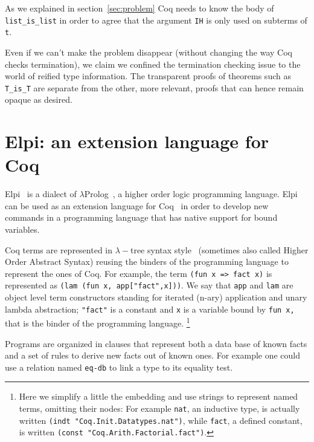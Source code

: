 \documentclass[a4paper,UKenglish,cleveref, autoref]{lipics-v2019}
\begin{document}
\noindent
As we explained in section~\ref{sec:problem} Coq needs to know the
body of  \lstinline+list_is_list+ in order to agree that the argument
\lstinline+IH+ is only used on subterms of \lstinline+t+.

Even if we can't make the problem disappear (without changing the way Coq
checks termination), we claim we confined the termination checking issue
to the world of reified type information. The transparent proofs of
theorems such as \lstinline+T_is_T+ are separate from the other, more
relevant, proofs that can hence remain opaque as desired.

\section{Elpi: an extension language for Coq} %
\label{sec:elpilang}

Elpi~\cite{dunchev:hal-01176856} is a dialect of
$\lambda$Prolog~\cite{miller_nadathur_2012}, a higher order logic
programming language. Elpi can be used as an extension language for
Coq~\cite{tassi:hal-01637063} in order to develop new commands in a programming
language that has native support for bound variables.

Coq terms are represented in $\lambda-$tree syntax
style~\cite{10.1007/3-540-44957-4_16} (sometimes also called
Higher Order Abstract Syntax) reusing the binders of the programming
language to represent the ones of Coq.
For example, the
term \lstinline+(fun x => fact x)+ is represented as
\lstinline+(lam (fun x, app["fact",x]))+. 
We say that \lstinline+app+ and \lstinline+lam+ are object level term
constructors standing for iterated (n-ary) application and unary lambda
abstraction; \lstinline+"fact"+ is a constant and \lstinline+x+ is a
variable bound by \lstinline+fun x,+ that is the binder
of the programming language.  \footnote{Here we simplify
a little the embedding and use strings to represent named terms,
omitting their nodes:
For example \lstinline+nat+,
an inductive type,
is actually written \lstinline+(indt "Coq.Init.Datatypes.nat")+,
while \lstinline+fact+, a defined constant,
is written \lstinline+(const "Coq.Arith.Factorial.fact")+.}

Programs are
organized in clauses that represent both a data base of known facts
and a set of rules to derive new facts out of known ones.
For example one could use a relation named \lstinline+eq-db+
to link a type to its equality test.
\end{document}
